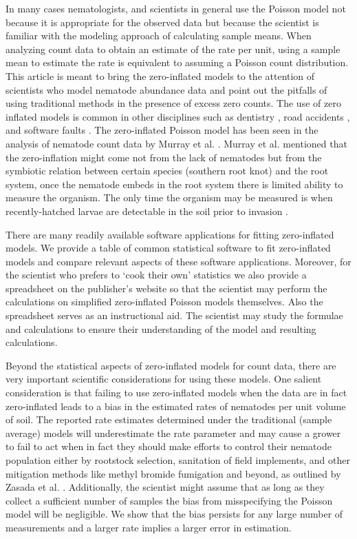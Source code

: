\documentclass{article}
\begin{document}
In many cases nematologists, and scientists in general use the Poisson model not because it is appropriate for the observed data but because the scientist is familiar with the modeling approach of calculating sample means. When analyzing count data to obtain an estimate of the rate per unit, using a sample mean to estimate the rate is equivalent to assuming a Poisson count distribution. This article is meant to bring the zero-inflated models to the attention of scientists who model nematode abundance data and point out the pitfalls of using traditional methods in the presence of excess zero counts. The use of zero inflated models is common in other disciplines such as dentistry \cite{bohning1999zero}, road accidents \cite{shankar1997modeling}, and software faults \cite{khoshgoftaar2001application}. The zero-inflated Poisson model has been seen in the analysis of nematode count data by Murray et al. \cite{murray2011modeling}. Murray et al. mentioned that the zero-inflation might come not from the lack of nematodes but from the symbiotic relation between certain species (southern root knot) and the root system, once the nematode embeds in the root system there is limited ability to measure the organism. The only time the organism may be measured is when recently-hatched larvae are detectable in the soil prior to invasion \cite{murray2011modeling}.

There are many readily available software applications for fitting zero-inflated models. We provide a table of common statistical software to fit zero-inflated models and compare relevant aspects of these software applications. Moreover, for the scientist who prefers to `cook their own' statistics we also provide a spreadsheet on the publisher's website so that the scientist may perform the calculations on simplified zero-inflated Poisson models themselves. Also the spreadsheet serves as an instructional aid. The scientist may study the formulae and calculations to ensure their understanding of the model and resulting calculations.  

Beyond the statistical aspects of zero-inflated models for count data, there are very important scientific considerations for using these models. One salient consideration is that failing to use zero-inflated models when the data are in fact zero-inflated leads to a bias in the estimated rates of nematodes per unit volume of soil. The reported rate estimates determined under the traditional (sample average) models will underestimate the rate parameter and may cause a grower to fail to act when in fact they should make efforts to control their nematode population either by rootstock selection, sanitation of field implements, and other mitigation methods like methyl bromide fumigation and beyond, as outlined by Zasada et al. \cite{zasada2010managing}.  Additionally, the scientist might assume that as long as they collect a sufficient number of samples the bias from misspecifying the Poisson model will be negligible. We show that the bias persists for any large number of measurements and a larger rate implies a larger error in estimation. 
\end{document}

